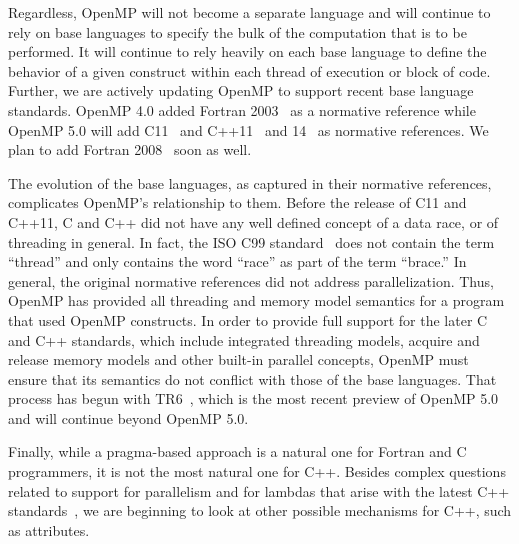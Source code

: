Regardless, OpenMP will not become a separate language and will 
continue to rely on base languages to specify the bulk of the
computation that is to be performed. It will continue to rely heavily 
on each base language to define the behavior of a given construct 
within each thread of execution or block of code. Further, we are
actively updating OpenMP to support recent base language standards. 
OpenMP 4.0 added Fortran 2003~\cite{F2003} as a normative reference
while OpenMP 5.0 will add C11~\cite{c11} and C++11~\cite{c++11} and
14~\cite{c++14} as normative references. We plan to add Fortran 
2008~\cite{F2008} soon as well.

The evolution of the base languages, as captured in their normative
references, complicates OpenMP's relationship to them. Before the 
release of C11 and C++11, C and C++ did not have any well defined 
concept of a data race, or of threading in general. In fact, the 
ISO C99 standard~\cite{c99} does not contain the term ``thread'' 
and only contains the word ``race'' as part of the term ``brace.''
In general, the original normative references did not address
parallelization. Thus, OpenMP has provided all threading and memory 
model semantics for a program that used OpenMP constructs. In 
order to provide full support for the later C and C++ standards, 
which include integrated threading models, acquire and release 
memory models and other built-in parallel concepts, OpenMP must 
ensure that its semantics do not conflict with those of the base
languages. That process has begun with TR6~\cite{openmptr6}, which is 
the most recent preview of OpenMP 5.0 and will continue beyond
OpenMP 5.0.

Finally, while a pragma-based approach is a natural one for Fortran
and C programmers, it is not the most natural one for C++. Besides
complex questions related to support for parallelism and for lambdas
that arise with the latest C++ standards~\cite{c++17}, we are beginning to look at
other possible mechanisms for C++, such as attributes.


